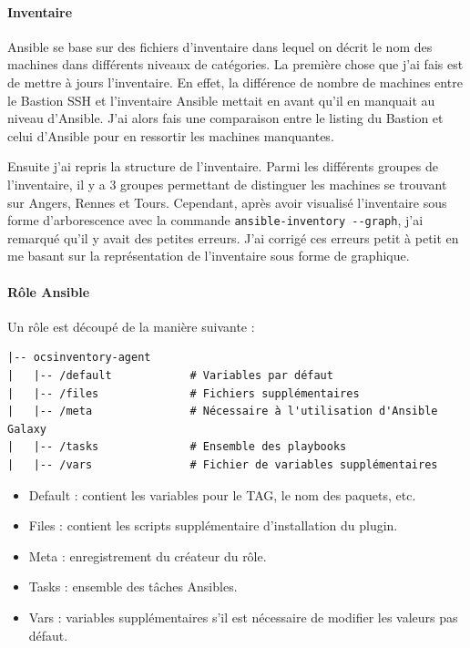 \documentclass[12pt]{article}
\begin{document}
\paragraph{Inventaire}
Ansible se base sur des fichiers d'inventaire dans lequel on décrit le nom des machines dans différents niveaux de catégories. 
La première chose que j'ai fais est de mettre à jours l'inventaire. 
En effet, la différence de nombre de machines entre le Bastion SSH et l'inventaire Ansible mettait en avant qu'il en manquait au niveau d'Ansible. 
J'ai alors fais une comparaison entre le listing du Bastion et celui d'Ansible pour en ressortir les machines manquantes.

Ensuite j'ai repris la structure de l'inventaire. 
Parmi les différents groupes de l'inventaire, il y a 3 groupes permettant de distinguer les machines se trouvant sur Angers, Rennes et Tours. 
Cependant, après avoir visualisé l'inventaire sous forme d'arborescence avec la commande \verb|ansible-inventory --graph|, j'ai remarqué qu'il y avait des petites erreurs. 
J'ai corrigé ces erreurs petit à petit en me basant sur la représentation de l'inventaire sous forme de graphique.

\paragraph{Rôle Ansible}
Un rôle est découpé de la manière suivante :
\begin{verbatim}
|-- ocsinventory-agent
|   |-- /default            # Variables par défaut
|   |-- /files              # Fichiers supplémentaires
|   |-- /meta               # Nécessaire à l'utilisation d'Ansible Galaxy
|   |-- /tasks              # Ensemble des playbooks
|   |-- /vars               # Fichier de variables supplémentaires
\end{verbatim}

\begin{itemize}
    \item Default : contient les variables pour le TAG, le nom des paquets, etc.
    \item Files : contient les scripts supplémentaire d'installation du plugin.
    \item Meta : enregistrement du créateur du rôle.
    \item Tasks : ensemble des tâches Ansibles.
    \item Vars : variables supplémentaires s'il est nécessaire de modifier les valeurs pas défaut.
\end{itemize}
\end{document}

